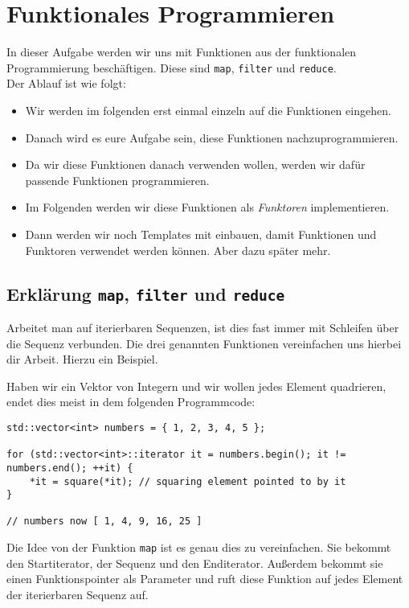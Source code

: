 \section{Funktionales Programmieren}

In dieser Aufgabe werden wir uns mit Funktionen aus der funktionalen Programmierung beschäftigen.
Diese sind \lstinline{map}, \lstinline{filter} und \lstinline{reduce}. \\

Der Ablauf ist wie folgt:
\begin{itemize}
    \item Wir werden im folgenden erst einmal einzeln auf die Funktionen eingehen.
    \item Danach wird es eure Aufgabe sein, diese Funktionen nachzuprogrammieren.
    \item Da wir diese Funktionen danach verwenden wollen, werden wir dafür passende Funktionen programmieren.
	\item Im Folgenden werden wir diese Funktionen als \emph{Funktoren} implementieren.
	\item Dann werden wir noch Templates mit einbauen, damit Funktionen und Funktoren verwendet werden können.
			Aber dazu später mehr.
\end{itemize}

\subsection{Erklärung \lstinline{map}, \lstinline{filter} und \lstinline{reduce}}

Arbeitet man auf iterierbaren Sequenzen, ist dies fast immer mit Schleifen über die Sequenz verbunden.
Die drei genannten Funktionen vereinfachen uns hierbei dir Arbeit.
Hierzu ein Beispiel.

Haben wir ein Vektor von Integern und wir wollen jedes Element quadrieren, endet dies meist in dem folgenden Programmcode:

\begin{lstlisting}
std::vector<int> numbers = { 1, 2, 3, 4, 5 };

for (std::vector<int>::iterator it = numbers.begin(); it != numbers.end(); ++it) {
    *it = square(*it); // squaring element pointed to by it
}

// numbers now [ 1, 4, 9, 16, 25 ]
\end{lstlisting}

Die Idee von der Funktion \lstinline{map} ist es genau dies zu vereinfachen.
Sie bekommt den Startiterator, der Sequenz und den Enditerator.
Außerdem bekommt sie einen Funktionspointer als Parameter und ruft diese Funktion auf jedes Element der iterierbaren Sequenz auf.


